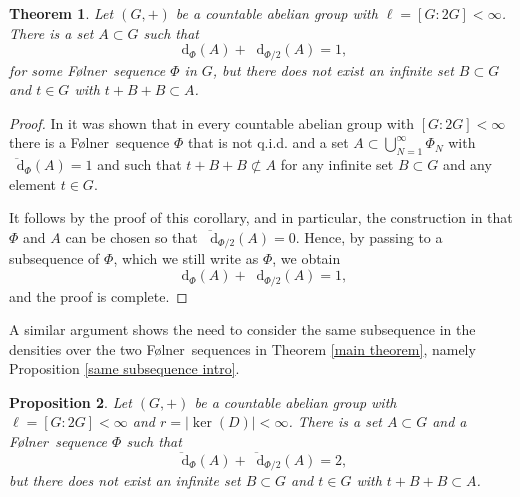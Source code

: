 \documentclass[reqno]{amsart}
\newcommand*\diff{\mathop{}\!\mathrm{d}}
\newtheorem{theorem}{Theorem}[section]
\newtheorem{proposition}[theorem]{Proposition}
\theoremstyle{definition}
\theoremstyle{remark}
\theoremstyle{remark}
\newcommand{\Folner}{F\o{}lner}
\begin{document}
\begin{theorem}\label{optimality 1}
Let $(G,+)$ be a countable abelian group with 
$\ell=[G:2G]<\infty$. There is a set 
$A\subset G$ such that 
$$\diff_{\Phi}(A)+\diff_{\Phi/2}(A)=1, $$
for some \Folner\ sequence $\Phi$ in $G$, but there does not 
exist an infinite set $B\subset G$ and $t\in G$ with 
$t+B+B\subset A$.    
\end{theorem}

\begin{proof}
In 
\cite[Corollary 5.6]{charamaras_kousek_mountakis_radic2025BBingroups} it was shown that in every countable abelian 
group with $[G:2G]<\infty$ there is a \Folner\ sequence $\Phi$ 
that is not q.i.d. and a set $A\subset \bigcup_{N=1}^{\infty} \Phi_N$ with $\overline{\diff}_{\Phi}(A)=1$ and 
such that $t+B+B \not\subset A$ for any infinite set $B\subset G$ and any element $t\in G$.

It follows by the proof of this corollary, and in particular, the construction in \cite[Lemma 5.5]{charamaras_kousek_mountakis_radic2025BBingroups} that $\Phi$ and $A$ can be chosen so that $\overline{\diff}_{\Phi/2}(A)=0$. Hence, by passing to a subsequence of $\Phi$, which we still write as $\Phi$, we obtain 
$$\diff_{\Phi}(A)+\diff_{\Phi/2}(A)=1,$$
and the proof is complete.
\end{proof}

A similar argument shows the need to consider the 
same subsequence in the densities over the two \Folner\ 
sequences in Theorem \ref{main theorem}, namely Proposition \ref{same subsequence intro}. 

\begin{proposition}\label{same subsequence}
Let $(G,+)$ be a countable abelian group with 
$\ell=[G:2G]<\infty$ and $r=|\ker(D)|<\infty$. There is a set 
$A\subset G$ and a \Folner\ sequence $\Phi$ such that 
$$\overline{\diff}_{\Phi}(A)+\overline{\diff}_{\Phi/2}(A)=2, 
$$
but there does not exist an infinite set $B\subset G$ and 
$t\in G$ with $t+B+B\subset A$.        
\end{proposition}
\end{document}
